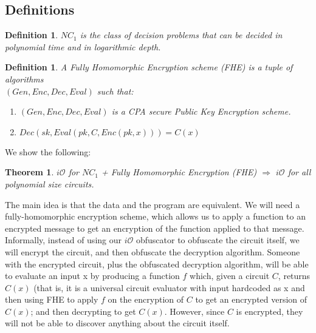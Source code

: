 \documentclass{article}
\newtheorem{theorem}{Theorem}%
\newtheorem{definition}[corollary]{Definition}
\newcommand{\io}{i\mathcal{O}}
\begin{document}
    \subsection{Definitions}
    \begin{definition}
        \textsc{$NC_1$} is the class of decision problems that can be decided in polynomial time and in logarithmic depth.
    \end{definition}
    \begin{definition}
        A Fully Homomorphic Encryption scheme (FHE) is a tuple of algorithms \\ $(Gen, Enc, Dec, Eval)$ such that:
        \begin{enumerate}
            \item $(Gen, Enc, Dec, Eval)$ is a CPA secure Public Key Encryption scheme.

            \item $Dec(sk, Eval(pk, C, Enc(pk, x))) = C(x)$
        \end{enumerate}
    \end{definition}
    \noindent We show the following:
    \begin{theorem}
        $\io$ for \textsc{$NC_1$} + Fully Homomorphic Encryption (FHE) $\Rightarrow$ $\io$ for all polynomial size circuits.
    \end{theorem}
    \noindent The main idea is that the data and the program are equivalent. We will need a fully-homomorphic encryption scheme, which allows us to apply a function to an encrypted message to get an encryption of the function applied to that message. Informally, instead of using our $\io$ obfuscator to obfuscate the circuit itself, we will encrypt the circuit, and then obfuscate the decryption algorithm. Someone with the encrypted circuit, plus the obfuscated decryption algorithm, will be able to evaluate an input x by producing a function $f$ which, given a circuit $C$, returns $C(x)$ (that is, it is a universal circuit evaluator with input hardcoded as x and then using FHE to apply $f$ on the encryption of $C$ to get an encrypted version of $C(x)$; and then decrypting to get $C(x)$. However, since $C$ is encrypted, they will not be able to discover anything about the circuit itself.
\end{document}
